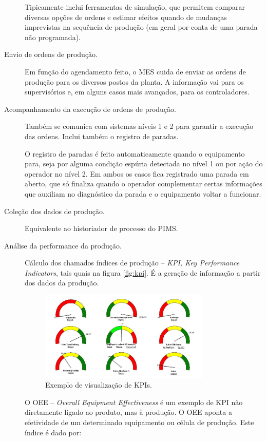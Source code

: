 \begin{description}
	Tipicamente inclui ferramentas de simulação, que permitem comparar diversas opções de ordens e estimar efeitos quando de mudanças imprevistas na sequência de produção (em geral por conta de uma parada não programada).

	\item[Envio de ordens de produção.] Em função do agendamento feito, o MES cuida de enviar as ordens de produção para os diversos postos da planta. A informação vai para os supervisórios e, em alguns casos mais avançados, para os controladores.
	\item[Acompanhamento da execução de ordens de produção.] Também se comunica com sistemas níveis 1 e 2 para garantir a execução das ordens. Inclui também o registro de paradas.

	O registro de paradas é feito automaticamente quando o equipamento para, seja por alguma condição espúria detectada no nível 1 ou por ação do operador no nível 2. Em ambos os casos fica registrado uma parada em aberto, que só finaliza quando o operador complementar certas informações que auxiliam no diagnóstico da parada e o equipamento voltar a funcionar.

	\item[Coleção dos dados de produção.] Equivalente ao historiador de processo do PIMS.
	\item[Análise da performance da produção.] Cálculo dos chamados índices de produção -- \emph{KPI, Key Performance Indicators}, tais quais na figura \ref{fig:kpi}. É a geração de informação a partir dos dados da produção.
\begin{figure}[hbt]
	\begin{center}
		\includegraphics[width=0.8\textwidth]{figuras/kpi}
	\end{center}
	\caption{Exemplo de visualização de KPIs.}
	\label{fig:figure1}
\end{figure}

	O OEE -- \emph{Overall Equipment Effectiveness} é um exemplo de KPI não diretamente ligado ao produto, mas à produção. O OEE aponta a efetividade de um determinado equipamento ou célula de produção. Este índice é dado por:


\end{description}

